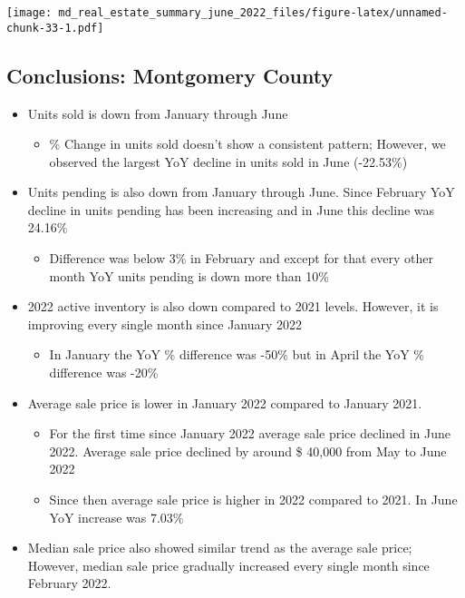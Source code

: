 \documentclass[
]{article}
\providecommand{\tightlist}{%
  \setlength{\itemsep}{0pt}\setlength{\parskip}{0pt}}
\begin{document}
\texttt{[image: md\_real\_estate\_summary\_june\_2022\_files/figure-latex/unnamed-chunk-33-1.pdf]}

\hypertarget{conclusions-montgomery-county}{%
\subsection{Conclusions: Montgomery
County}\label{conclusions-montgomery-county}}

\begin{itemize}
\tightlist
\item
  Units sold is down from January through June

  \begin{itemize}
  \tightlist
  \item
    \% Change in units sold doesn't show a consistent pattern; However,
    we observed the largest YoY decline in units sold in June
    (-22.53\%)\\
  \end{itemize}
\item
  Units pending is also down from January through June. Since February
  YoY decline in units pending has been increasing and in June this
  decline was 24.16\%

  \begin{itemize}
  \tightlist
  \item
    Difference was below 3\% in February and except for that every other
    month YoY units pending is down more than 10\%
  \end{itemize}
\item
  2022 active inventory is also down compared to 2021 levels. However,
  it is improving every single month since January 2022

  \begin{itemize}
  \tightlist
  \item
    In January the YoY \% difference was -50\% but in April the YoY \%
    difference was -20\%
  \end{itemize}
\item
  Average sale price is lower in January 2022 compared to January 2021.

  \begin{itemize}
  \tightlist
  \item
    For the first time since January 2022 average sale price declined in
    June 2022. Average sale price declined by around \$ 40,000 from May
    to June 2022
  \item
    Since then average sale price is higher in 2022 compared to 2021. In
    June YoY increase was 7.03\%
  \end{itemize}
\item
  Median sale price also showed similar trend as the average sale price;
  However, median sale price gradually increased every single month
  since February 2022.


\end{itemize}
\end{document}

